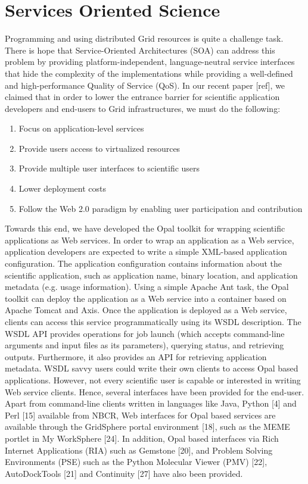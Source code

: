 \documentclass[conference]{IEEEtran}
\begin{document}
\section {Services Oriented Science}

Programming and using distributed Grid resources is quite a challenge task.
There is hope that Service-Oriented Architectures (SOA) can address this
problem by providing platform-independent, language-neutral service
interfaces that hide the complexity of the implementations while providing
a well-defined and high-performance Quality of Service (QoS). In our recent
paper [ref], we claimed that in order to lower the entrance barrier for
scientific application developers and end-users to Grid infrastructures, we
must do the following: 

\begin{enumerate}
\item{Focus on application-level services}
\item{Provide users access to virtualized resources}
\item{Provide multiple user interfaces to scientific users}
\item{Lower deployment costs}
\item{Follow the Web 2.0 paradigm by enabling user participation and contribution}
\end{enumerate}

Towards this end, we have developed the Opal toolkit
\cite{opal} for wrapping scientific applications as Web services. In order
to wrap an application as a Web service, application developers are
expected to write a simple XML-based application configuration. The
application configuration contains information about the scientific
application, such as application name, binary location, and application
metadata (e.g. usage information). Using a simple Apache Ant task, the Opal
toolkit can deploy the application as a Web service into a container based
on Apache Tomcat and Axis. Once the application is deployed as a Web
service, clients can access this service programmatically using its WSDL
description. The WSDL API provides operations for job launch (which accepts
command-line arguments and input files as its parameters), querying status,
and retrieving outputs. Furthermore, it also provides an API for retrieving
application metadata. WSDL savvy users could write their own clients to
access Opal based applications. However, not every scientific user is
capable or interested in writing Web service clients. Hence, several
interfaces have been provided for the end-user. Apart from command-line
clients written in languages like Java, Python [4] and Perl [15] available
from NBCR, Web interfaces for Opal based services are available through the
GridSphere portal environment [18], such as the MEME portlet in My
WorkSphere [24]. In addition, Opal based interfaces via Rich Internet
Applications (RIA) such as Gemstone [20], and Problem Solving Environments
(PSE) such as the Python Molecular Viewer (PMV) [22], AutoDockTools [21]
and Continuity [27] have also been provided.
\end{document}
